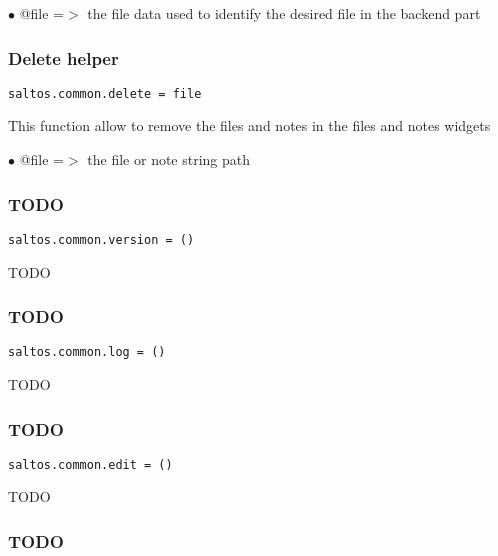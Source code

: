 \documentclass[a4paper]{article}
\begin{document}
\begin{compactitem}
\item[\color{myblue}$\bullet$] @file =$>$ the file data used to identify the desired file in the backend part
\end{compactitem}

\hypertarget{toc681}{}
\subsubsection{Delete helper}

\begin{lstlisting}
saltos.common.delete = file
\end{lstlisting}

This function allow to remove the files and notes in the files and notes widgets

\begin{compactitem}
\item[\color{myblue}$\bullet$] @file =$>$ the file or note string path
\end{compactitem}

\hypertarget{toc682}{}
\subsubsection{TODO}

\begin{lstlisting}
saltos.common.version = ()
\end{lstlisting}

TODO

\hypertarget{toc683}{}
\subsubsection{TODO}

\begin{lstlisting}
saltos.common.log = ()
\end{lstlisting}

TODO

\hypertarget{toc684}{}
\subsubsection{TODO}

\begin{lstlisting}
saltos.common.edit = ()
\end{lstlisting}

TODO

\hypertarget{toc685}{}
\subsubsection{TODO}
\end{document}

